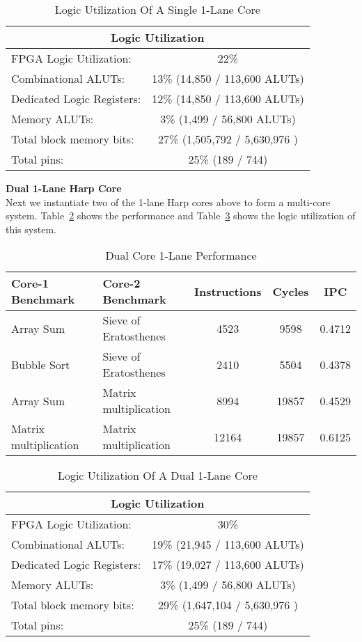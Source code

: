 \begin{table}[!htbp]
  \centering
  \begin{tabular}{|l|c|}
    \hline
    \multicolumn{2}{|c|}{Logic Utilization} \\
    \hline
FPGA Logic Utilization:		& 22\% 	\\
   Combinational ALUTs:		& 13\% 	(14,850 / 113,600 ALUTs)\\
   Dedicated Logic Registers:	& 12\% 	(14,850 / 113,600 ALUTs)\\
   Memory ALUTs:		& 3\% 	(1,499 / 56,800 ALUTs)\\
Total block memory bits:	& 27\%  (1,505,792 / 5,630,976 )\\
Total pins:			& 25\% 	(189 / 744)\\
    \hline
  \end{tabular}
  \caption{Logic Utilization Of A Single 1-Lane Core}
  \label{table:fpga_util1}
\end{table}

\noindent\textbf{Dual 1-Lane Harp Core}\\
Next we instantiate two of the 1-lane Harp cores above to form a multi-core system. Table~\ref{table:perf2} shows the performance and Table~\ref{table:fpga_util2} shows the logic utilization of this system.

\begin{table}[!htbp]
  \centering
  \begin{tabular}{|l|l|c|c|c|}
    \hline
Core-1 Benchmark	&Core-2 Benchmark	&Instructions 	&Cycles		&IPC	\\
    \hline
Array Sum   	&Sieve of Eratosthenes 			&4523		&9598		&0.4712	\\
Bubble Sort   	&Sieve of Eratosthenes    			&2410		&5504		&0.4378	\\
Array Sum		&Matrix multiplication		&8994		&19857		&0.4529	\\
Matrix multiplication&Matrix multiplication	&12164		&19857		&0.6125 \\
    \hline
  \end{tabular}
  \caption{Dual Core 1-Lane Performance}
  \label{table:perf2}
\end{table}

\begin{table}[!htbp]
  \centering
  \begin{tabular}{|l|c|}
    \hline
    \multicolumn{2}{|c|}{Logic Utilization} \\
    \hline
FPGA Logic Utilization:		& 30\% 	\\
   Combinational ALUTs:		& 19\% 	(21,945 / 113,600 ALUTs)\\
   Dedicated Logic Registers:	& 17\% 	(19,027 / 113,600 ALUTs)\\
   Memory ALUTs:		& 3\% 	(1,499 / 56,800 ALUTs)\\
Total block memory bits:	& 29\%  (1,647,104 / 5,630,976 )\\
Total pins:			& 25\% 	(189 / 744)\\
    \hline
  \end{tabular}
  \caption{Logic Utilization Of A Dual 1-Lane Core}
  \label{table:fpga_util2}
\end{table}

